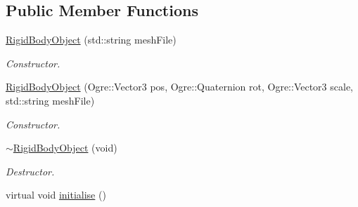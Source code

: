 \subsection*{Public Member Functions}
\begin{DoxyCompactItemize}
\item 
\hyperlink{class_objects_1_1_rigid_body_object_a1ed19d8ed67672ed4a7b1c824c95f592}{Rigid\-Body\-Object} (std\-::string mesh\-File)
\begin{DoxyCompactList}\small\item\em Constructor. \end{DoxyCompactList}\item 
\hyperlink{class_objects_1_1_rigid_body_object_aaa91269d5e4e1c25d8f2f4dd1edc1dee}{Rigid\-Body\-Object} (Ogre\-::\-Vector3 pos, Ogre\-::\-Quaternion rot, Ogre\-::\-Vector3 scale, std\-::string mesh\-File)
\begin{DoxyCompactList}\small\item\em Constructor. \end{DoxyCompactList}\item 
\hypertarget{class_objects_1_1_rigid_body_object_abd8cfa1d049fcdffd725118f29e8d4d0}{\hyperlink{class_objects_1_1_rigid_body_object_abd8cfa1d049fcdffd725118f29e8d4d0}{$\sim$\-Rigid\-Body\-Object} (void)}\label{class_objects_1_1_rigid_body_object_abd8cfa1d049fcdffd725118f29e8d4d0}

\begin{DoxyCompactList}\small\item\em Destructor. \end{DoxyCompactList}\item 
\hypertarget{class_objects_1_1_rigid_body_object_a08f19a117e240c6234350b0f9404fbc9}{virtual void \hyperlink{class_objects_1_1_rigid_body_object_a08f19a117e240c6234350b0f9404fbc9}{initialise} ()}\label{class_objects_1_1_rigid_body_object_a08f19a117e240c6234350b0f9404fbc9}


\end{DoxyCompactItemize}
